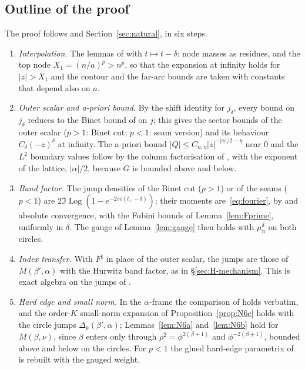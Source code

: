 \subsection{Outline of the proof}\label{sec:H-proof}
The proof follows \cite[Sections~5--10]{PaperII} and Section~\ref{sec:natural}, in six steps.
\begin{enumerate}
\item[(H-a)] \emph{Interpolation.} The lemmas of \cite[Section~5]{PaperII} with $t\mapsto t-\delta$: node masses as residues, and the top
node $X_1=(n/a)^p>n^p$, so that the expansion at infinity holds for $|z|>X_1$ and the contour and the far-arc bounds are taken
with constants that depend also on $a$.
\item[(H-b)] \emph{Outer scalar and a-priori bound.} By the shift identity for $j_\delta$, every bound on $j_\delta$ reduces to the Binet
bound of \cite{PaperII} on $j$; this gives the sector bounds of the outer scalar ($p>1$: Binet cut; $p<1$: seam version) and its
behaviour $C_\delta(-z)^\delta$ at infinity. The a-priori bound $|Q|\le C_{n,\eta}|z|^{-|\alpha|/2-\eta}$ near $0$ and the $L^2$ boundary
values follow by the column factorisation of \cite[Appendix~C]{PaperII}, with the exponent of the lattice, $|\alpha|/2$, because $G$
is bounded above and below.
\item[(H-c)] \emph{Band factor.} The jump densities of the Binet cut ($p>1$) or of the seams ($p<1$) are
$2\Im\operatorname{Log}(1-e^{-2\pi i(t_+-\delta)})$; their moments are~\eqref{eq:fourier}, by \cite[(5.9.1), (5.2.1), (25.2.1)]{DLMF} and
absolute convergence, with the Fubini bounds of Lemma~\ref{lem:Fprime}, uniformly in $\delta$. The gauge of
Lemma~\ref{lem:gauge} then holds with $\mu^\delta_n$ on both circles.
\item[(H-d)] \emph{Index transfer.} With $F^\natural$ in place of the outer scalar, the jumps are those of $M(\beta',\alpha)$ with the
Hurwitz band factor, as in \S\ref{sec:H-mechanism}. This is exact algebra on the jumps of \cite[Section~5]{PaperII}.
\item[(H-e)] \emph{Hard edge and small norm.} In the $\alpha$-frame the comparison of \cite[Section~7]{PaperII} holds verbatim, and the
order-$K$ small-norm expansion of Proposition~\ref{prop:N6c} holds with the circle jumps $\Delta_k(\beta',\alpha)$; Lemmas~\ref{lem:N6a}
and~\ref{lem:N6b} hold for $M(\beta,\nu)$, since $\beta$ enters only through $\rho^2=\phi^{2(\beta+1)}$ and $\phi^{-2(\beta+1)}$, bounded above
and below on the circles. For $p<1$ the glued hard-edge parametrix of \cite[Section~10]{PaperII} is rebuilt with the gauged weight,

\end{enumerate}
